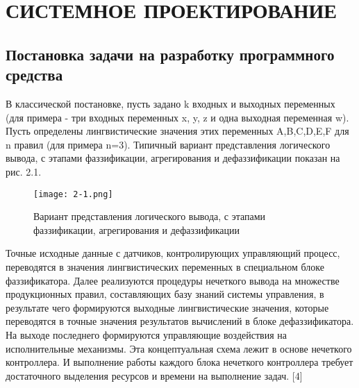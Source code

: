 \lstset{style=pythonstyle}

\section{СИСТЕМНОЕ ПРОЕКТИРОВАНИЕ}
\label{sec:sys}

\subsection{Постановка задачи на разработку программного средства}
\label{sub:sys:1}

В классической постановке, пусть задано k входных и выходных   переменных (для примера - три входных переменных x, y, z и одна выходная переменная w). Пусть определены лингвистические значения этих переменных A,B,C,D,E,F для n правил (для примера n=3).  Типичный вариант представления логического вывода, с этапами фаззификации,  агрегирования и дефаззификации показан на рис. 2.1.

\begin{figure}[ht]
  \centering
  \texttt{[image: 2-1.png]}
  \caption{Вариант представления логического вывода, с этапами фаззификации,  агрегирования и дефаззификации }
  \label{fig:sys:1:1}
\end{figure}

Точные исходные данные с датчиков, контролирующих управляющий процесс, переводятся в значения лингвистических переменных в специальном блоке фаззификатора. Далее реализуются процедуры нечеткого вывода на множестве продукционных правил, составляющих базу знаний системы управления, в результате чего формируются выходные лингвистические значения, которые переводятся в точные значения результатов вычислений в блоке дефаззификатора. На выходе последнего формируются управляющие воздействия на исполнительные механизмы. Эта концептуальная схема лежит в основе нечеткого контроллера. И выполнение работы каждого блока нечеткого контроллера требует достаточного выделения ресурсов и времени на выполнение задач. [4]


